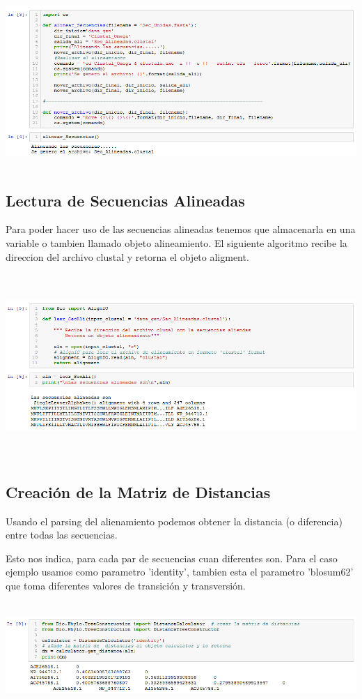 \documentclass[a4paper]{article}
\begin{document}
\begin{center}
	\includegraphics[width=16cm,height=6.5cm]{Alin_Sec.png}
\end{center}

\subsection{Lectura de Secuencias Alineadas}
Para poder hacer uso de las secuencias alineadas tenemos que almacenarla en una variable o tambien llamado objeto alineamiento. El siguiente algoritmo recibe la direccion del archivo clustal y retorna el objeto aligment.

\begin{center}
	\includegraphics[width=16cm,height=7cm]{leerAlin.png}
\end{center}


\subsection{Creación de la Matriz de Distancias}
Usando el parsing del alienamiento podemos obtener la distancia (o diferencia) entre todas las secuencias.

Esto nos indica, para cada par de secuencias cuan diferentes son.
Para el caso ejemplo usamos como parametro 'identity', tambien esta el parametro 'blosum62' que toma diferentes valores de transición y transversión. 
\begin{center}
	\includegraphics[width=16cm,height=4cm]{matriz.png}
\end{center}
\end{document}
